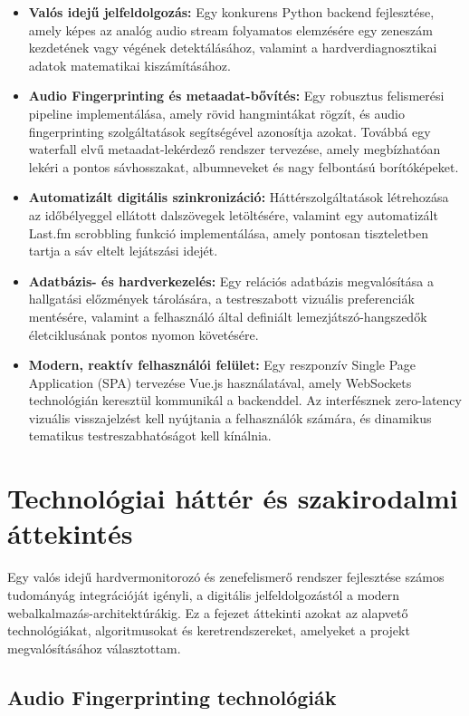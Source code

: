 \documentclass[12pt,a4paper,hungarian]{report}
\begin{document}
\begin{itemize}
    \item \textbf{Valós idejű jelfeldolgozás:} Egy konkurens Python backend fejlesztése, amely képes az analóg audio stream folyamatos elemzésére egy zeneszám kezdetének vagy végének detektálásához, valamint a hardverdiagnosztikai adatok matematikai kiszámításához.
    \item \textbf{Audio Fingerprinting és metaadat-bővítés:} Egy robusztus felismerési pipeline implementálása, amely rövid hangmintákat rögzít, és audio fingerprinting szolgáltatások segítségével azonosítja azokat. Továbbá egy waterfall elvű metaadat-lekérdező rendszer tervezése, amely megbízhatóan lekéri a pontos sávhosszakat, albumneveket és nagy felbontású borítóképeket.
    \item \textbf{Automatizált digitális szinkronizáció:} Háttérszolgáltatások létrehozása az időbélyeggel ellátott dalszövegek letöltésére, valamint egy automatizált Last.fm scrobbling funkció implementálása, amely pontosan tiszteletben tartja a sáv eltelt lejátszási idejét.
    \item \textbf{Adatbázis- és hardverkezelés:} Egy relációs adatbázis megvalósítása a hallgatási előzmények tárolására, a testreszabott vizuális preferenciák mentésére, valamint a felhasználó által definiált lemezjátszó-hangszedők életciklusának pontos nyomon követésére.
    \item \textbf{Modern, reaktív felhasználói felület:} Egy reszponzív Single Page Application (SPA) tervezése Vue.js használatával, amely WebSockets technológián keresztül kommunikál a backenddel. Az interfésznek zero-latency vizuális visszajelzést kell nyújtania a felhasználók számára, és dinamikus tematikus testreszabhatóságot kell kínálnia.
\end{itemize}

\chapter{Technológiai háttér és szakirodalmi áttekintés}

Egy valós idejű hardvermonitorozó és zenefelismerő rendszer fejlesztése számos tudományág integrációját igényli, a digitális jelfeldolgozástól a modern webalkalmazás-architektúrákig. Ez a fejezet áttekinti azokat az alapvető technológiákat, algoritmusokat és keretrendszereket, amelyeket a projekt megvalósításához választottam.

\section{Audio Fingerprinting technológiák}
\end{document}
